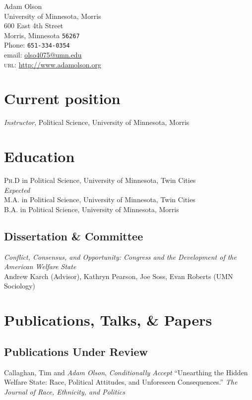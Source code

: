 \documentclass[12pt, letter]{article}
\newcommand{\years}[1]{\marginnote{\normalsize #1}}
\begin{document}
{\LARGE Adam Olson}\\[1cm]
University of Minnesota, Morris\\
600 East 4th Street \\
Morris, Minnesota \texttt{56267} \\[.2cm]
Phone: \texttt{651-334-0354}\\
email: \href{mailto:olso4075@umn.edu}{olso4075@umn.edu}\\
\textsc{url}: \href{http://www.adamolson.org}{http://www.adamolson.org} 

\section*{Current position}
\emph{Instructor}, Political Science, University of Minnesota, Morris

\section*{Education}
\noindent
\years{2016}\textsc{Ph.D} in Political Science, University of Minnesota, Twin Cities\\
\textit{Expected}\\
\years{2014}\textsc{M.A.} in Political Science, University of Minnesota, Twin Cities\\
\years{2010}\textsc{B.A.} in Political Science, University of Minnesota, Morris

\subsection*{Dissertation \& Committee}
\emph{Conflict, Consensus, and Opportunity: Congress and the Development of the American Welfare State} \\
Andrew Karch (Advisor), Kathryn Pearson, Joe Soss, Evan Roberts (UMN Sociology)

\section*{Publications, Talks, \& Papers}
\subsection*{Publications Under Review}
\noindent
Callaghan, Tim and \emph{Adam Olson}, \textit{Conditionally Accept} ``Unearthing the Hidden Welfare State: Race, Political Attitudes, and Unforeseen Consequences.'' \textit{The Journal of Race, Ethnicity, and Politics}
\end{document}
